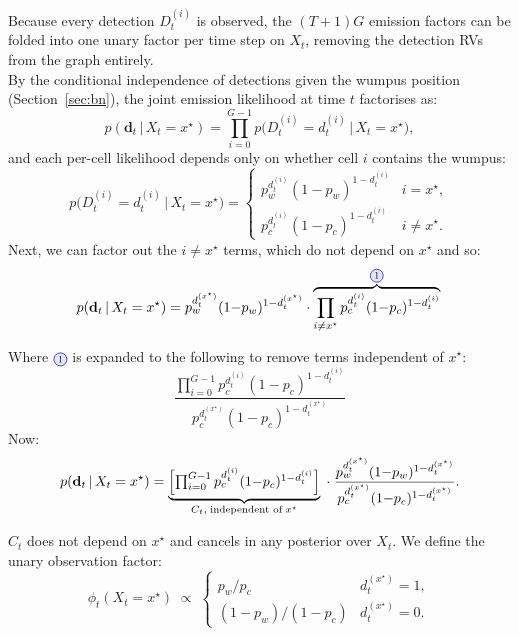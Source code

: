 \documentclass[11pt, a4paper]{article}
\newcommand{\given}{\,\vert\,}
\newcommand{\bd}{\mathbf{d}}
\newcommand*\circled[3]{%
\tikz[
    baseline=(char.base),
    scale=#3,
    transform shape
]{
    \node[
        shape=circle,
        draw=blue!60!black,
        fill=blue!10,
        line width=0.5pt,
        inner sep=0.01pt,
        minimum size=2.0ex
    ] (char) {\strut\raisebox{#2}{#1}};
}}
\begin{document}
Because every detection $D_t^{(i)}$ is observed, the $(T{+}1) G$ emission
factors can be folded into one unary factor per time step on $X_t$, removing
the detection RVs from the graph entirely. \\[8pt]
\noindent By the conditional independence of detections given the wumpus position
(Section~\ref{sec:bn}), the joint emission likelihood at time $t$
factorises as:
\begin{equation*}
p(\bd_t \given X_t = x^\star)
= \prod_{i=0}^{G-1} p \bigl(D_t^{(i)} = d_t^{(i)} \given X_t = x^\star\bigr),
\end{equation*}
and each per-cell likelihood depends only on whether cell $i$ contains the
wumpus:
\begin{equation*}
p \bigl(D_t^{(i)} = d_t^{(i)} \given X_t = x^\star\bigr) =
\begin{cases}
p_w^{d_t^{(i)}} (1{-}p_w)^{1-d_t^{(i)}} & i = x^\star, \\
p_c^{d_t^{(i)}} (1{-}p_c)^{1-d_t^{(i)}} & i \neq x^\star.
\end{cases}
\end{equation*}
Next, we can factor out the $i \neq x^\star$ terms, which do not depend on $x^\star$ and so:
\begin{equation*}
p(\bd_t \given X_t = x^\star)
= p_w^{d_t^{(x^\star)}} (1{-}p_w)^{1-d_t^{(x^\star)}}
   \cdot \overbrace{\prod_{i \neq x^\star} p_c^{d_t^{(i)}} (1{-}p_c)^{1-d_t^{(i)}}}^{ \circled{1}{-0.5pt}{0.7} } \\
\end{equation*}

Where $\circled{1}{-0.5pt}{0.7}$ is expanded to the following to remove terms independent of $x^\star$:
\[
\frac{\prod_{i =0}^{G-1} p_c^{d_t^{(i)}} (1{-}p_c)^{1-d_t^{(i)}}}{p_c^{d_t^{(x^\star)}} (1{-}p_c)^{1-d_t^{(x^\star)}}}
\]
Now: 
\begin{equation*}
p(\bd_t \given X_t = x^\star) = \underbrace{\Bigl[\textstyle\prod_{i=0}^{G-1} p_c^{d_t^{(i)}}
   (1{-}p_c)^{1-d_t^{(i)}}\Bigr]}_{C_t,\;\text{independent of}\;x^\star}
\;\cdot\;
\frac{p_w^{d_t^{(x^\star)}} (1{-}p_w)^{1-d_t^{(x^\star)}}}
     {p_c^{d_t^{(x^\star)}} (1{-}p_c)^{1-d_t^{(x^\star)}}}.
\end{equation*}



$C_t$ does not depend on $x^\star$ and cancels in any posterior over $X_t$.
We define the unary observation factor:
\[
\phi_t(X_t = x^\star) \;\propto\;
\begin{cases}
p_w / p_c              & d_t^{(x^\star)} = 1, \\
(1 - p_w) / (1 - p_c)  & d_t^{(x^\star)} = 0.
\end{cases}
\]
\label{eq:phi}
\end{document}
